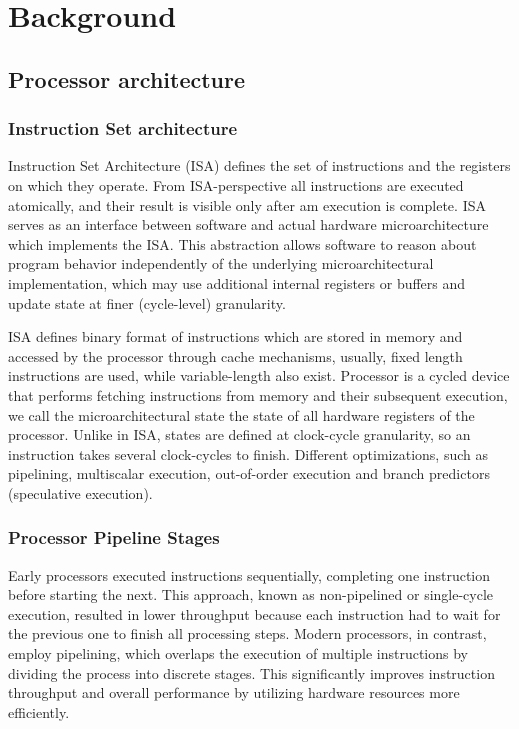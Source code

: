 \chapter{Background}

\section{Processor architecture}

\subsection{Instruction Set architecture}

Instruction Set Architecture (ISA) defines the set of instructions and the registers on which they operate. From ISA-perspective all instructions are executed atomically, and their result is visible only after am execution is complete. ISA serves as an interface between software and actual hardware microarchitecture which implements the ISA. This abstraction allows software to reason about program behavior independently of the underlying microarchitectural implementation, which may use additional internal registers or buffers and update state at finer (cycle-level) granularity.


ISA defines binary format of instructions which are stored in memory and accessed by the processor through cache mechanisms, usually, fixed length instructions are used, while variable-length also exist. Processor is a cycled device that performs fetching instructions from memory and their subsequent execution, we call the microarchitectural state the state of all hardware registers of the processor. Unlike in ISA, states are defined at clock-cycle granularity, so an instruction takes several clock-cycles to finish. Different optimizations, such as pipelining, multiscalar execution, out-of-order execution and branch predictors (speculative execution).


\subsection{Processor Pipeline Stages}

Early processors executed instructions sequentially, completing one instruction before starting the next. This approach, known as non-pipelined or single-cycle execution, resulted in lower throughput because each instruction had to wait for the previous one to finish all processing steps. Modern processors, in contrast, employ pipelining, which overlaps the execution of multiple instructions by dividing the process into discrete stages. This significantly improves instruction throughput and overall performance by utilizing hardware resources more efficiently.

